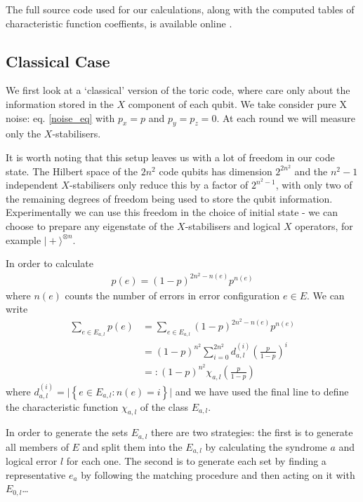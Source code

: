 The full source code used for our calculations, along with the computed tables of characteristic function coeffients, is available online \cite{?}.

\subsection{Classical Case}

We first look at a `classical' version of the toric code, where care only about the information stored in the $X$ component of each qubit. We take consider pure X noise: eq. \ref{noise_eq} with $p_x = p$ and $p_y = p_z = 0$. At each round we will measure only the $X$-stabilisers.

It is worth noting that this setup leaves us with a lot of freedom in our code state. The Hilbert space of the $2n^2$ code qubits has dimension $2^{2n^2}$ and the $n^2-1$ independent $X$-stabilisers only reduce this by a factor of $2^{n^2-1}$, with only two of the remaining degrees of freedom being used to store the qubit information. Experimentally we can use this freedom in the choice of initial state - we can choose to prepare any eigenstate of the $X$-stabilisers and logical $X$ operators, for example $\vert + \rangle^{\otimes n}$.

In order to calculate
\begin{align}
  p(e) = (1-p)^{2n^2 - n(e)} p^{n(e)}
\end{align}
where $n(e)$ counts the number of errors in error configuration $e \in E$. We can write
\begin{align}
  \sum_{e \in E_{a,l}} p(e) &= \sum_{e \in E_{a,l}} (1-p)^{2n^2 - n(e)} p^{n(e)} \\
  &= (1-p)^{n^2} \sum_{i = 0}^{2n^2} d_{a,l}^{(i)} \left(\frac{p}{1-p}\right)^i \\
  &=: (1-p)^{n^2} \chi_{a,l}\left(\frac{p}{1-p}\right)
\end{align}
where $d_{a,l}^{(i)} = \vert \left\{e \in E_{a,l} : n(e)=i \right\} \vert$ and we have used the final line to define the characteristic function $\chi_{a,l}$ of the class $E_{a,l}$.

In order to generate the sets $E_{a,l}$ there are two strategies: the first is to generate all members of $E$ and split them into the $E_{a,l}$ by calculating the syndrome $a$ and logical error $l$ for each one. The second is to generate each set by finding a representative $e_{a}$ by following the matching procedure and then acting on it with $E_{0, l}$\ldots 

